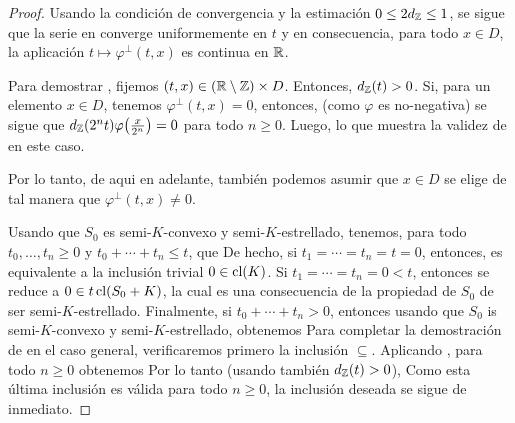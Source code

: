 \begin{proof} 
	Usando la condici\'on de convergencia  y la estimaci\'on 
	$0\leq 2d_{\mathbb{Z}}\leq1$, se sigue que la serie en  converge 
	uniformemente en $t$ y en consecuencia, para todo $x\in D$,
	la aplicaci\'on $t\mapsto\varphi^\perp(t,x)$ es continua en $\mathbb{R}$.
	
	Para demostrar , fijemos $(t,x)\in(\mathbb{R}\setminus\mathbb{Z})\times D$.
	Entonces, $d_{\mathbb{Z}}(t)>0$. Si, para un elemento $x\in D$, tenemos 
	$\varphi^\perp(t,x)=0$, entonces, (como $\varphi$ es no-negativa)
	se sigue que $d_{\mathbb{Z}}(2^nt)\varphi\big(\frac{x}{2^n}\big)=0$
	para todo $n\geq0$. Luego,
	lo que muestra la validez de  en este caso.
	
	Por lo tanto, de aqui en adelante, tambi\'en podemos asumir que 
	$x\in D$ se elige de tal manera que $\varphi^\perp(t,x)\neq0$.
	
	Usando que $S_0$ es semi-$K$-convexo y semi-$K$-estrellado,
	tenemos, para todo $t_0,\dots,t_n\geq0$ y $t_0+\cdots+t_n\leq t$, 
	que
	De hecho, si $t_1=\cdots=t_n=t=0$, entonces,  es equivalente
	a la inclusi\'on trivial $0\in\mathop{\hbox{\rm cl}}\nolimits(K)$. Si $t_1=\cdots=t_n=0<t$, entonces
	 se reduce a $0\in t\mathop{\hbox{\rm cl}}\nolimits(S_0+K)$, la cual es 
	una consecuencia de la propiedad de $S_0$ de ser semi-$K$-estrellado.
	Finalmente, si $t_0+\cdots+t_n>0$, entonces usando que $S_0$ is semi-$K$-convexo
	y semi-$K$-estrellado, obtenemos
	Para completar la demostraci\'on de  en el caso general,
	verificaremos primero la inclusi\'on $\subseteq$.
	Aplicando , para todo $n\geq0$ obtenemos
	Por lo tanto (usando tambi\'en $d_{\mathbb{Z}}(t)>0$),
	Como esta \'ultima inclusi\'on es v\'alida para todo $n\geq0$,
	la inclusi\'on deseada se sigue de inmediato.


\end{proof}
